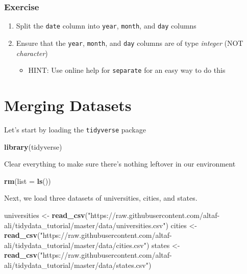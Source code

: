 \documentclass[]{article}
\newenvironment{Shaded}{\begin{snugshade}}{\end{snugshade}}
\newcommand{\KeywordTok}[1]{\textcolor[rgb]{0.13,0.29,0.53}{\textbf{{#1}}}}
\newcommand{\DataTypeTok}[1]{\textcolor[rgb]{0.13,0.29,0.53}{{#1}}}
\newcommand{\StringTok}[1]{\textcolor[rgb]{0.31,0.60,0.02}{{#1}}}
\newcommand{\NormalTok}[1]{{#1}}
\providecommand{\tightlist}{%
  \setlength{\itemsep}{0pt}\setlength{\parskip}{0pt}}
\theoremstyle{definition}
\theoremstyle{definition}
\theoremstyle{definition}
\theoremstyle{remark}
\begin{document}
\subsubsection{Exercise}\label{exercise-4}

\begin{enumerate}
\def\labelenumi{\arabic{enumi}.}
\tightlist
\item
  Split the \texttt{date} column into \texttt{year}, \texttt{month}, and
  \texttt{day} columns
\item
  Ensure that the \texttt{year}, \texttt{month}, and \texttt{day}
  columns are of type \emph{integer} (NOT \emph{character})

  \begin{itemize}
  \tightlist
  \item
    HINT: Use online help for \texttt{separate} for an easy way to do
    this
  \end{itemize}
\end{enumerate}

\section{Merging Datasets}\label{merging-datasets}

Let's start by loading the \texttt{tidyverse} package

\begin{Shaded}
\begin{Highlighting}[]
\KeywordTok{library}\NormalTok{(tidyverse)}
\end{Highlighting}
\end{Shaded}

Clear everything to make sure there's nothing leftover in our
environment

\begin{Shaded}
\begin{Highlighting}[]
\KeywordTok{rm}\NormalTok{(}\DataTypeTok{list =} \KeywordTok{ls}\NormalTok{())}
\end{Highlighting}
\end{Shaded}

Next, we load three datasets of universities, cities, and states.

\begin{Shaded}
\begin{Highlighting}[]
\NormalTok{universities <-}\StringTok{ }\KeywordTok{read_csv}\NormalTok{(}\StringTok{"https://raw.githubusercontent.com/altaf-ali/tidydata_tutorial/master/data/universities.csv"}\NormalTok{)}
\NormalTok{cities <-}\StringTok{ }\KeywordTok{read_csv}\NormalTok{(}\StringTok{"https://raw.githubusercontent.com/altaf-ali/tidydata_tutorial/master/data/cities.csv"}\NormalTok{)}
\NormalTok{states <-}\StringTok{ }\KeywordTok{read_csv}\NormalTok{(}\StringTok{"https://raw.githubusercontent.com/altaf-ali/tidydata_tutorial/master/data/states.csv"}\NormalTok{)}
\end{Highlighting}
\end{Shaded}
\end{document}
